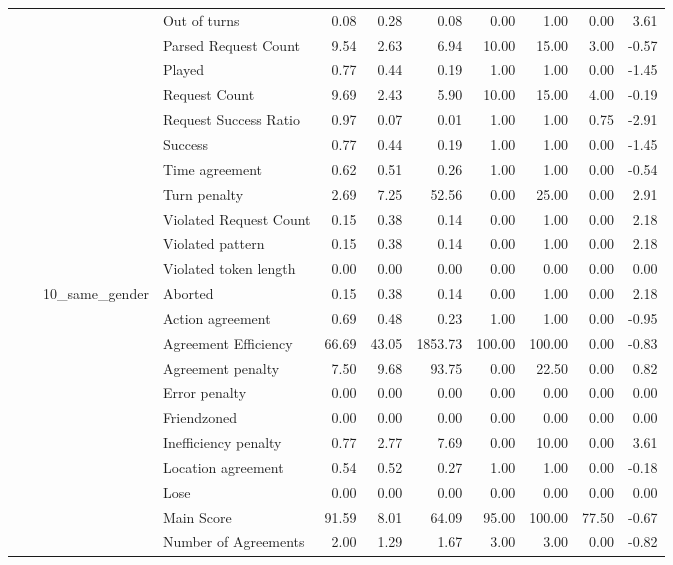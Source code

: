 \begin{tabular}{llllrrrrrrr}
 &  &  & Out of turns & 0.08 & 0.28 & 0.08 & 0.00 & 1.00 & 0.00 & 3.61 \\
 &  &  & Parsed Request Count & 9.54 & 2.63 & 6.94 & 10.00 & 15.00 & 3.00 & -0.57 \\
 &  &  & Played & 0.77 & 0.44 & 0.19 & 1.00 & 1.00 & 0.00 & -1.45 \\
 &  &  & Request Count & 9.69 & 2.43 & 5.90 & 10.00 & 15.00 & 4.00 & -0.19 \\
 &  &  & Request Success Ratio & 0.97 & 0.07 & 0.01 & 1.00 & 1.00 & 0.75 & -2.91 \\
 &  &  & Success & 0.77 & 0.44 & 0.19 & 1.00 & 1.00 & 0.00 & -1.45 \\
 &  &  & Time agreement & 0.62 & 0.51 & 0.26 & 1.00 & 1.00 & 0.00 & -0.54 \\
 &  &  & Turn penalty & 2.69 & 7.25 & 52.56 & 0.00 & 25.00 & 0.00 & 2.91 \\
 &  &  & Violated Request Count & 0.15 & 0.38 & 0.14 & 0.00 & 1.00 & 0.00 & 2.18 \\
 &  &  & Violated pattern & 0.15 & 0.38 & 0.14 & 0.00 & 1.00 & 0.00 & 2.18 \\
 &  &  & Violated token length & 0.00 & 0.00 & 0.00 & 0.00 & 0.00 & 0.00 & 0.00 \\
\cline{3-11}
 &  & \multirow[t]{27}{*}{10_same_gender} & Aborted & 0.15 & 0.38 & 0.14 & 0.00 & 1.00 & 0.00 & 2.18 \\
 &  &  & Action agreement & 0.69 & 0.48 & 0.23 & 1.00 & 1.00 & 0.00 & -0.95 \\
 &  &  & Agreement Efficiency & 66.69 & 43.05 & 1853.73 & 100.00 & 100.00 & 0.00 & -0.83 \\
 &  &  & Agreement penalty & 7.50 & 9.68 & 93.75 & 0.00 & 22.50 & 0.00 & 0.82 \\
 &  &  & Error penalty & 0.00 & 0.00 & 0.00 & 0.00 & 0.00 & 0.00 & 0.00 \\
 &  &  & Friendzoned & 0.00 & 0.00 & 0.00 & 0.00 & 0.00 & 0.00 & 0.00 \\
 &  &  & Inefficiency penalty & 0.77 & 2.77 & 7.69 & 0.00 & 10.00 & 0.00 & 3.61 \\
 &  &  & Location agreement & 0.54 & 0.52 & 0.27 & 1.00 & 1.00 & 0.00 & -0.18 \\
 &  &  & Lose & 0.00 & 0.00 & 0.00 & 0.00 & 0.00 & 0.00 & 0.00 \\
 &  &  & Main Score & 91.59 & 8.01 & 64.09 & 95.00 & 100.00 & 77.50 & -0.67 \\
 &  &  & Number of Agreements & 2.00 & 1.29 & 1.67 & 3.00 & 3.00 & 0.00 & -0.82 \\

\end{tabular}

